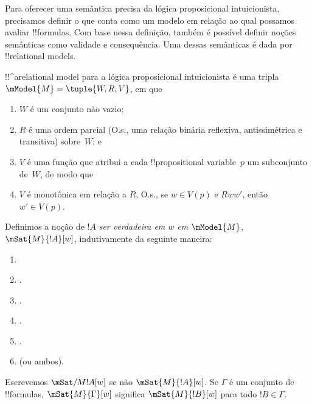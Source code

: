 \documentclass[../../../include/open-logic-section]{subfiles}
\begin{document}


Para oferecer uma semântica precisa da lógica proposicional
intuicionista, precisamos definir o que conta como um modelo em relação
ao qual possamos avaliar !!{formula}s. Com base nessa definição,
também é possível definir noções semânticas como validade e
consequência. Uma dessas semânticas é dada por !!{relational model}s.

\begin{defn}
  !!^a{relational model} para a lógica proposicional intuicionista é
  uma tripla $\mModel{M} = \tuple{W, R, V}$, em que
  \begin{enumerate}
  \item $W$ é um conjunto não vazio;
  \item $R$ é uma ordem parcial (O.s.\@, uma relação binária reflexiva,
    antissimétrica e transitiva) sobre~$W$; e
  \item $V$ é uma função que atribui a cada !!{propositional
    variable}~$p$ um subconjunto de~$W$, de modo que
  \item $V$ é monotônica em relação a $R$, O.s.\@, se $w
    \in V(p)$ e $Rww'$, então $w' \in V(p)$.
  \end{enumerate}
\end{defn}

\begin{defn}
  Definimos a noção de $!A$ \emph{ser verdadeira em $w$ em
    $\mModel{M}$}, $\mSat{M}{!A}[w]$, indutivamente da seguinte maneira:
  \begin{enumerate}
  \item {}
  \item {}.
  \item {}.
  \item {}.
  \item {}.
  \item {} (ou ambos).
  \end{enumerate}
  Escrevemos $\mSat/{M}{!A}[w]$ se não $\mSat{M}{!A}[w]$. Se $\Gamma$ é
  um conjunto de !!{formula}s, $\mSat{M}{\Gamma}[w]$ significa
  $\mSat{M}{!B}[w]$ para todo $!B \in \Gamma$.
\end{defn}
\end{document}
